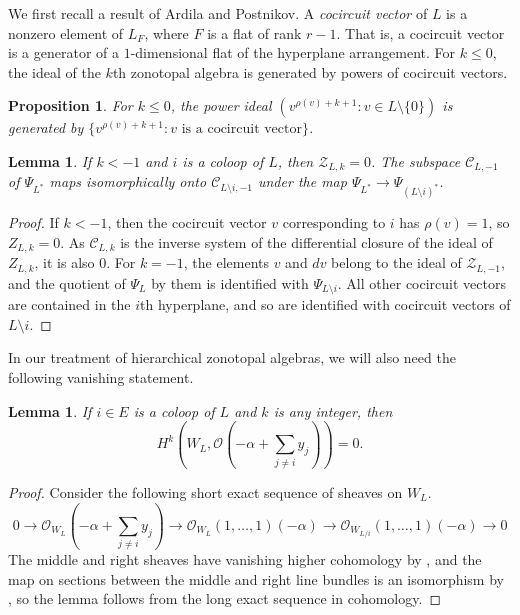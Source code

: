 \documentclass{amsart}
\newtheorem{proposition}[theorem]{Proposition}
\newtheorem{lemma}[theorem]{Lemma}
\newcommand{\OO}{\mathcal{O}}
\theoremstyle{definition}
\begin{document}
We first recall a result of Ardila and Postnikov. A \emph{cocircuit vector} of $L$ is a nonzero element of $L_F$, where $F$ is a flat of rank $r-1$. That is, a cocircuit vector is a generator of a $1$-dimensional flat of the hyperplane arrangement. For $k \le 0$, the ideal of the $k$th zonotopal algebra is generated by powers of cocircuit vectors. 

\begin{proposition}\label{prop:APcocircuit}\cite[Lemma 1]{APCorrection}
For $k \le 0$, the power ideal $(v^{\rho(v) + k + 1} : v \in L \setminus \{0\})$ is generated by $\{v^{\rho(v) + k + 1} : v \text{ is a cocircuit vector}\}$. 
\end{proposition}

\begin{lemma}\label{lem:negkcoloop}
If $k < -1$ and $i$ is a coloop of $L$, then $\mathcal{Z}_{L, k} = 0$. The subspace $\mathcal{C}_{L, -1}$ of $\Psi_{L^*}$ maps isomorphically onto $\mathcal{C}_{L \setminus i, -1}$ under the map $\Psi_{L^*} \to \Psi_{(L \setminus i)^*}$. 
\end{lemma}

\begin{proof}
If $k < -1$, then the cocircuit vector $v$ corresponding to $i$ has $\rho(v) = 1$, so $Z_{L, k} = 0$. As $\mathcal{C}_{L, k}$ is the inverse system of the differential closure of the ideal of $Z_{L, k}$, it is also $0$. For $k=-1$, the elements $v$ and $dv$ belong to the ideal of $\mathcal{Z}_{L, -1}$, and the quotient of $\Psi_L$ by them is identified with $\Psi_{L \setminus i}$. All other cocircuit vectors are contained in the $i$th hyperplane, and so are identified with cocircuit vectors of $L \setminus i$. 
\end{proof}

In our treatment of hierarchical zonotopal algebras, we will also need 
the following vanishing statement.
\begin{lemma}\label{lem:coloop-vanishing}
    If $i \in E$ is a coloop of $L$ and $k$ is any integer, then
    \[
        H^k(W_L, \mathcal{O}(-\alpha + \sum_{j \not= i} y_j)) = 0.
    \]
\end{lemma}
\begin{proof}
    Consider the following short exact sequence of sheaves on $W_L$.
    \[
        0 \to \OO_{W_L}(-\alpha + \sum_{j \not= i} y_j) \to \OO_{W_L}(1, \ldots, 
        1)(-\alpha) \to \OO_{W_{L/i}}(1, \ldots, 1)(-\alpha) \to 0
    \]
    The middle and right sheaves have vanishing higher cohomology 
    by , and the map on sections between the middle and 
    right line bundles is an isomorphism by 
    , so the lemma follows from the 
    long exact sequence in cohomology.
\end{proof}
\end{document}
